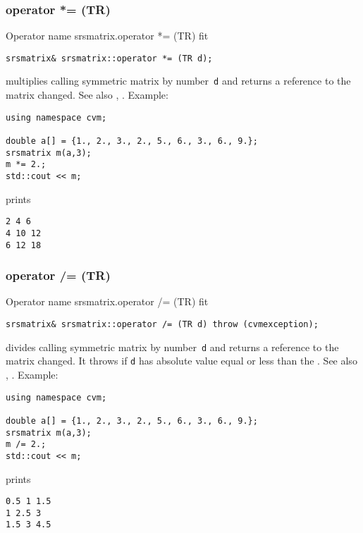 \subsubsection{operator *= (TR)}
Operator%
\pdfdest name {srsmatrix.operator *= (TR)} fit
\begin{verbatim}
srsmatrix& srsmatrix::operator *= (TR d);
\end{verbatim}
multiplies  calling symmetric matrix by  number~\verb"d"
and returns a reference to
the matrix changed.
See also ,
.
Example:
\begin{Verbatim}
using namespace cvm;

double a[] = {1., 2., 3., 2., 5., 6., 3., 6., 9.};
srsmatrix m(a,3);
m *= 2.;
std::cout << m;
\end{Verbatim}
prints
\begin{Verbatim}
2 4 6
4 10 12
6 12 18
\end{Verbatim}
\newpage



\subsubsection{operator /= (TR)}
Operator%
\pdfdest name {srsmatrix.operator /= (TR)} fit
\begin{verbatim}
srsmatrix& srsmatrix::operator /= (TR d) throw (cvmexception);
\end{verbatim}
divides  calling symmetric matrix by  number~\verb"d"
and returns a reference to
the matrix changed.
It throws  
if \verb"d" has  absolute value equal or less
than the 
.
See also ,
.
Example:
\begin{Verbatim}
using namespace cvm;

double a[] = {1., 2., 3., 2., 5., 6., 3., 6., 9.};
srsmatrix m(a,3);
m /= 2.;
std::cout << m;
\end{Verbatim}
prints
\begin{Verbatim}
0.5 1 1.5
1 2.5 3
1.5 3 4.5
\end{Verbatim}
\newpage



